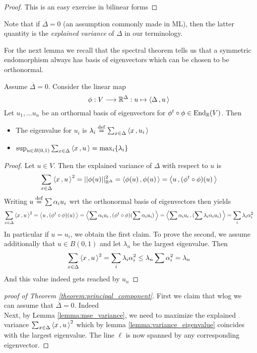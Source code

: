 \begin{proof}
This is an easy exercise in bilinear forms
\end{proof}

\begin{remark}
\label{remark:explained_variance}
Note that if $\overline{\Delta}=0$ (an assumption commonly made in ML), then the latter quantity is the \emph{explained variance} of $\Delta$ in our terminology.
\end{remark}
For the next lemma we recall that the spectral theorem tells us that a symmetric endomorphism always has basis of eigenvectors which can be chosen to be orthonormal.

\begin{lemma}
\label{lemma:variance_eigenvalue}
Assume $\overline{\Delta}=0$. Consider the linear map
\[
\phi: V\longrightarrow \mathbb{R}^{\Delta}:u\mapsto \left\langle \Delta\,,u\, \right\rangle
\]
Let $u_1,\ldots u_n$ be an orthormal basis of eigenvectors for $\phi^t\circ \phi \in \operatorname{End}_{\mathbb{R}}(V)$.
Then
\begin{itemize}
\item The eigenvalue for $u_i$ is $\lambda_i \stackrel{\operatorname{def}}{=} \sum_{x\in \Delta}\left\langle x\,,u_i\, \right\rangle$
\item $\sup_{u\in B(0,1)} \sum_{x\in\Delta}\left\langle x\,,u\, \right\rangle=\max_i \{\lambda_i\}$
\end{itemize}
\end{lemma}

\begin{proof}
Let $u\in V$. Then the explained variance of $\Delta$ with respect to $u$ is
\[
\sum_{x\in\Delta}\left\langle x\,,u\, \right\rangle^2  = \vert\vert \phi(u)\vert\vert_{\mathbb{R}^\Delta}^2 = \left\langle \phi(u)\,,\phi(u)\, \right\rangle = \left\langle u\,,(\phi^t\circ \phi)(u)\, \right\rangle
\]
Writing $u\stackrel{\operatorname{def}}{=} \sum \alpha_iu_i$ wrt the orthonormal basis of eigenvectors then yields
\[
\sum_{x\in\Delta}\left\langle x\,,u\, \right\rangle^2  = \left\langle u\,,(\phi^t\circ \phi)(u)\, \right\rangle = \left\langle \sum\alpha_iu_i\,,(\phi^t\circ \phi)(\sum \alpha_i u_i )\, \right\rangle 
= \left\langle \sum\alpha_iu_i\,,(\sum \lambda_i\alpha_i u_i )\, \right\rangle = \sum_i \lambda_i\alpha_i^2
\]
In particular if $u=u_i$, we obtain the first claim. To prove the second, we assume additionally that $u \in B(0,1)$ and let $\lambda_n$ be the largest eigenvalue. Then
\[
\sum_{x\in\Delta}\left\langle x\,,u\, \right\rangle^2 =  \sum_i \lambda_i\alpha_i^2\le \lambda_n \sum \alpha_i^2 = \lambda_n
\]
And this value indeed gets reached by $u_n$
\end{proof}
{}{}
\begin{proof}[proof of Theorem \ref{theorem:principal_component}]
First we claim that wlog we can assume that $\overline{\Delta}=0$. Indeed\\
Next, by Lemma \ref{lemma:mse_variance}, we need to maximize the explained variance $\sum_{x\in\Delta}\left\langle x\,,u\, \right\rangle^2$ which by lemma \ref{lemma:variance_eigenvalue} {}coincides with the largest eigenvalue. The line $\ell$ is now spanned by any corresponding eigenvector.
\end{proof}

